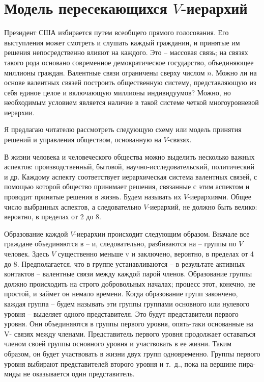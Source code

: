 \documentclass{book}
\begin{document}
\section{Модель пересекающихся $V$-иерархий}

Президент США избирается путем всеобщего прямого голо­сования. Его выступления может смотреть и слушать каждый гражданин, и принятые им решения непосредственно влияют на каждого. Это -- массовая связь; на связях такого рода осно­вано современное демократическое государство, объединяющее миллионы граждан. Валентные связи ограничены сверху числом $n$.  Можно ли на основе валентных связей построить общест­венную систему, представляющую из себя единое целое и вклю­чающую миллионы индивидуумов? Можно, но необходимым условием является наличие в такой системе четкой многоуров­невой иерархии.

Я предлагаю читателю рассмотреть следующую схему или модель принятия решений и управления обществом, основан­ную на $V$-связях.

В жизни человека и человеческого общества можно выделить несколько важных аспектов: производственный, бытовой, научно-исследовательский, политический и др. Каждому аспекту соответствует иерархическая система валентных связей, с по­мощью которой общество принимает решения, связанные с этим аспектом и проводит принятые решения в жизнь. Будем назы­вать их $V$-иерархиями. Общее число выбранных аспектов, а сле­довательно  $V$-иерархий, не должно быть велико: вероятно, в пределах от 2 до 8.

Образование каждой $V$-иерархии происходит следующим образом. Вначале все граждане объединяются в -- и, следова­тельно, разбиваются на -- группы по $V$  человек. Здесь $V$  су­щественно меньше v и  заключено, вероятно, в пределах от 4 до 8. Предполагается, что в группе устанавливаются -- в резуль­тате активных контактов -- валентные связи между каждой па­рой членов. Образование группы должно происходить на строго добровольных началах; процесс этот, конечно, не простой, и займет он немало времени. Когда образование групп закончено, каждая группа -- будем называть эти группы группами основ­ного или нулевого уровня -- выделяет одного представителя. Это будут представители первого уровня. Они объединяются в группы первого уровня, опять-таки основанные на V-  связях между членами. Представитель первого уровня продолжает оставаться членом своей группы основного уровня и участво­вать в ее жизни. Таким образом, он будет участвовать в жизни двух групп одновременно. Группы первого уровня выбирают представителей 
второго уровня и т.~д., пока на вершине пира­миды не оказывается один представитель.
\end{document}
